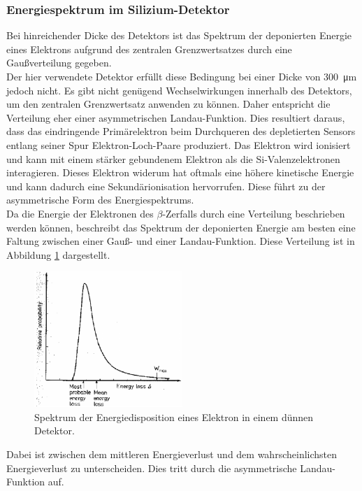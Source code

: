 \subsubsection{Energiespektrum im Silizium-Detektor}
Bei hinreichender Dicke des Detektors ist das Spektrum der deponierten Energie eines Elektrons aufgrund des zentralen Grenzwertsatzes durch eine Gaußverteilung gegeben.\\
Der hier verwendete Detektor erfüllt diese Bedingung bei einer Dicke von
\SI{300}{\micro\meter} jedoch nicht. Es gibt nicht genügend Wechselwirkungen
innerhalb des Detektors, um den zentralen Grenzwertsatz anwenden zu können.
Daher entspricht die Verteilung eher einer asymmetrischen Landau-Funktion.
Dies resultiert daraus, dass das eindringende Primärelektron beim Durchqueren des depletierten Sensors entlang seiner Spur Elektron-Loch-Paare produziert. Das Elektron wird ionisiert und kann mit einem stärker gebundenem Elektron als die Si-Valenzelektronen interagieren. Dieses Elektron widerum hat oftmals eine höhere kinetische Energie und kann dadurch eine Sekundärionisation hervorrufen. Diese führt zu der asymmetrische Form des Energiespektrums.\\
Da die Energie der Elektronen des $\beta$-Zerfalls durch eine Verteilung beschrieben werden können, beschreibt das Spektrum der deponierten Energie am besten eine Faltung zwischen einer Gauß- und einer Landau-Funktion. Diese Verteilung ist in Abbildung \ref{fig:faltung} dargestellt.
\begin{figure}[htb]
  \centering
  \includegraphics[width=0.5\textwidth]{graphics/Landau.pdf}
  \caption{Spektrum der Energiedisposition eines Elektron in einem dünnen Detektor. \cite{anleitung}}
  \label{fig:faltung}
\end{figure}
Dabei ist zwischen dem mittleren Energieverlust und dem wahrscheinlichsten Energieverlust zu unterscheiden. Dies tritt durch die asymmetrische Landau-Funktion auf.

